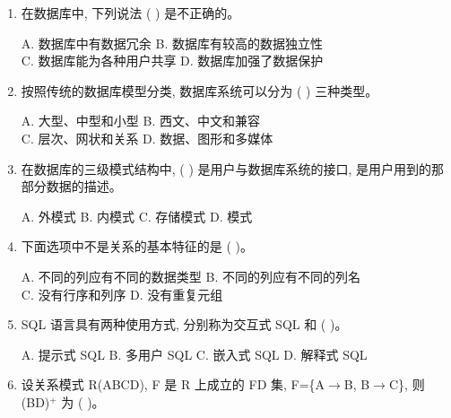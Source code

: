 \documentclass{ctexart} %
\begin{document}
\begin{enumerate}[label=\arabic*.] %
    \item 在数据库中, 下列说法 ( ) 是不正确的。
    \begin{flushleft} %
    A. 数据库中有数据冗余 \hspace{2cm} B. 数据库有较高的数据独立性 \\
    C. 数据库能为各种用户共享 \hspace{2cm} D. 数据库加强了数据保护
    \end{flushleft}
    \item 按照传统的数据库模型分类, 数据库系统可以分为 ( ) 三种类型。
    \begin{flushleft}
    A. 大型、中型和小型 \hspace{2cm} B. 西文、中文和兼容 \\
    C. 层次、网状和关系 \hspace{2cm} D. 数据、图形和多媒体
    \end{flushleft}
    \item 在数据库的三级模式结构中, ( ) 是用户与数据库系统的接口, 是用户用到的那部分数据的描述。
    \begin{flushleft}
    A. 外模式 \hspace{2cm} B. 内模式 \hspace{2cm} C. 存储模式 \hspace{2cm} D. 模式
    \end{flushleft}
    \item 下面选项中不是关系的基本特征的是 ( )。
    \begin{flushleft}
    A. 不同的列应有不同的数据类型 \hspace{2cm} B. 不同的列应有不同的列名 \\
    C. 没有行序和列序 \hspace{2cm} D. 没有重复元组
    \end{flushleft}
    \item SQL 语言具有两种使用方式, 分别称为交互式 SQL 和 ( )。
    \begin{flushleft}
    A. 提示式 SQL \hspace{2cm} B. 多用户 SQL \hspace{2cm} C. 嵌入式 SQL \hspace{2cm} D. 解释式 SQL
    \end{flushleft}
    \item 设关系模式 R(ABCD), F 是 R 上成立的 FD 集, F=\{A$\rightarrow$B, B$\rightarrow$C\}, 则 (BD)$^+$ 为 ( )。
    \begin{flushleft}

\end{flushleft}
\end{enumerate}
\end{document}
